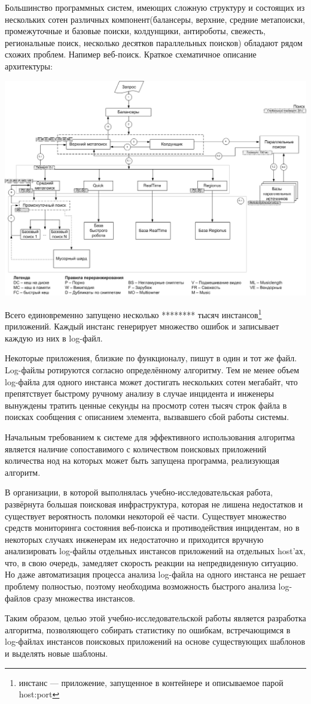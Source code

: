 Большинство программных систем, имеющих сложную структуру и состоящих из нескольких сотен различных компонент(балансеры, верхние, средние метапоиски, промежуточные и базовые поиски, колдунщики, антироботы, свежесть, региональные поиск, несколько десятков параллельных поисков) обладают рядом схожих проблем. Напимер веб-поиск. Краткое схематичное описание архитектуры:

\includegraphics[width=\textwidth]{pics/search.png}

Всего единовременно запущено несколько ******** тысяч инстансов\footnote{инстанс --- приложение, запущенное в контейнере и описываемое парой host:port} приложений. Каждый инстанс генерирует множество ошибок и записывает каждую из них в log-файл.

Некоторые приложения, близкие по функционалу, пишут в один и тот же файл. Log-файлы ротируются согласно определённому алгоритму. Тем не менее объем log-файла для одного инстанса может достигать нескольких сотен мегабайт, что препятствует быстрому ручному анализу в случае инцидента и инженеры вынуждены тратить ценные секунды на просмотр сотен тысяч строк файла в поисках сообщения с описанием элемента, вызвавшего сбой работы системы.

Начальным требованием к системе для эффективного использования алгоритма является наличие сопоставимого с количеством поисковых приложений количества нод на которых может быть запущена программа, реализующая алгоритм.

В организации, в которой выполнялась учебно-исследовательская работа, развёрнута большая поисковая инфраструктура, которая не лишена недостатков и существует вероятность поломки некоторой её части. Существует множество средств мониторинга состояния веб-поиска и противодействия инцидентам, но в некоторых случаях инженерам их недостаточно и приходится вручную анализировать log-файлы отдельных инстансов приложений на отдельных host'ах, что, в свою очередь, замедляет скорость реакции на непредвиденную ситуацию. Но даже автоматизация процесса анализа log-файла на одного инстанса не решает проблему полностью, поэтому необходима возможность быстрого анализа log-файлов сразу множества инстансов.

Таким образом, целью этой учебно-исследовательской работы является разработка алгоритма, позволяющего собирать статистику по ошибкам, встречающимся в log-файлах инстансов поисковых приложений на основе существующих шаблонов и выделять новые шаблоны.
